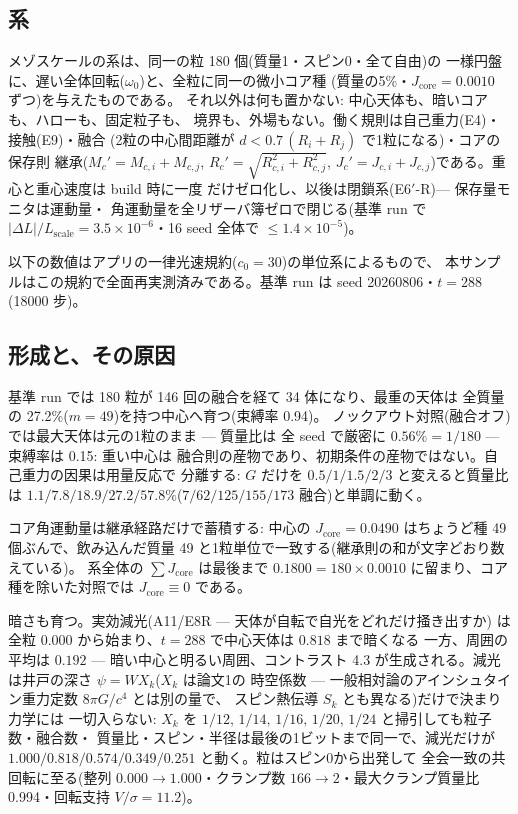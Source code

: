 \documentclass[a4paper,10pt,twocolumn]{ltjsarticle}
\begin{document}
\subsection{系}

メゾスケールの系は、同一の粒 180 個(質量1・スピン0・全て自由)の
一様円盤に、遅い全体回転($\omega_0$)と、全粒に同一の微小コア種
(質量の5\%・$J_{\mathrm{core}}=0.0010$ ずつ)を与えたものである。
それ以外は何も置かない: 中心天体も、暗いコアも、ハローも、固定粒子も、
境界も、外場もない。働く規則は自己重力(E4)・接触(E9)・融合
(2粒の中心間距離が $d<0.7\,(R_i+R_j)$ で1粒になる)・コアの保存則
継承($M_c' = M_{c,i}+M_{c,j}$, $R_c' = \sqrt{R_{c,i}^2+R_{c,j}^2}$,
$J_c' = J_{c,i}+J_{c,j}$)である。重心と重心速度は build 時に一度
だけゼロ化し、以後は閉鎖系(E6$'$-R)— 保存量モニタは運動量・
角運動量を全リザーバ簿ゼロで閉じる(基準 run で
$|\Delta L|/L_{\mathrm{scale}} = 3.5\times10^{-6}$・16 seed 全体で
$\leq 1.4\times10^{-5}$)。

以下の数値はアプリの一律光速規約($c_0=30$)の単位系によるもので、
本サンプルはこの規約で全面再実測済みである。基準 run は
seed 20260806・$t=288$(18000 步)。

\subsection{形成と、その原因}

基準 run では 180 粒が 146 回の融合を経て 34 体になり、最重の天体は
全質量の 27.2\%($m=49$)を持つ中心へ育つ(束縛率 0.94)。
ノックアウト対照(融合オフ)では最大天体は元の1粒のまま — 質量比は
全 seed で厳密に $0.56\% = 1/180$ — 束縛率は 0.15: 重い中心は
融合則の産物であり、初期条件の産物ではない。自己重力の因果は用量反応で
分離する: $G$ だけを $0.5/1/1.5/2/3$ と変えると質量比は
$1.1/7.8/18.9/27.2/57.8\%$($7/62/125/155/173$ 融合)と単調に動く。

コア角運動量は継承経路だけで蓄積する: 中心の
$J_{\mathrm{core}}=0.0490$ はちょうど種 49 個ぶんで、飲み込んだ質量
49 と1粒単位で一致する(継承則の和が文字どおり数えている)。
系全体の $\sum J_{\mathrm{core}}$ は最後まで
$0.1800 = 180\times0.0010$ に留まり、コア種を除いた対照では
$J_{\mathrm{core}}\equiv 0$ である。

暗さも育つ。実効減光(A11/E8R — 天体が自転で自光をどれだけ掻き出すか)
は全粒 $0.000$ から始まり、$t=288$ で中心天体は $0.818$ まで暗くなる
一方、周囲の平均は $0.192$ — 暗い中心と明るい周囲、コントラスト 4.3
が生成される。減光は井戸の深さ $\psi=W X_k$($X_k$ は論文1の
時空係数 — 一般相対論のアインシュタイン重力定数 $8\pi G/c^4$ とは別の量で、
スピン熱伝導 $S_k$ とも異なる)だけで決まり力学には
一切入らない: $X_k$ を $1/12,\,1/14,\,1/16,\,1/20,\,1/24$ と掃引しても粒子数・融合数・
質量比・スピン・半径は最後の1ビットまで同一で、減光だけが
$1.000/0.818/0.574/0.349/0.251$ と動く。粒はスピン0から出発して
全会一致の共回転に至る(整列 $0.000\rightarrow1.000$・クランプ数
$166\rightarrow2$・最大クランプ質量比 0.994・回転支持
$V/\sigma=11.2$)。
\end{document}
